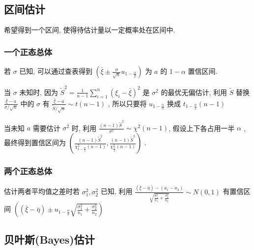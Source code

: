 \documentclass[10pt]{yerbaformat}
\begin{document}
\subsection{区间估计}
\par 希望得到一个区间, 使得待估计量以一定概率处在区间中.
\subsubsection{一个正态总体}
\par 若 $\sigma$ 已知, 可以通过查表得到 $\left(\bar{\xi} \pm \frac{\sigma}{\sqrt{n}} u_{1-\frac{\alpha}{2}}\right)$ 为 $a$ 的 $1-\alpha$ 置信区间.

\par 当 $\sigma$ 未知时, 因为 $\tilde{S}^{2}=\frac{1}{n-1} \sum_{i=1}^{n}\left(\xi_{i}-\bar{\xi}\right)^{2}$ 是 $\sigma^{2}$ 的最优无偏估计, 利用 $\tilde{S}$ 替换 $\frac{\bar{\xi}-a}{\sigma / \sqrt{n}}$ 中的 $\sigma$ 有 $\frac{\bar{\xi}-a}{\tilde{S} / \sqrt{n}} \sim t(n-1)$ , 所以只要将 $u_{1-\frac{\alpha}{2}}$ 换成 $t_{1-\frac{\alpha}{2}}(n-1)$

\par 当未知 $a$ 需要估计 $\sigma^2$ 时, 利用 $\frac{(n-1) \tilde{S}^{2}}{\sigma^{2}} \sim \chi^{2}(n-1)$, 假设上下各占用一半 $\alpha$ , 最终得到置信区间为 $\left(\frac{(n-1) \tilde{S}^{2}}{\chi_{1-\frac{\alpha}{2}}^{2}(n-1)}, \frac{(n-1) \tilde{S}^{2}}{\chi_{\frac{\alpha}{2}}^{2}(n-1)}\right)$ .

\subsubsection{两个正态总体}
\par 估计两者平均值之差时若 $\sigma_{1}^{2}, \sigma_{2}^{2}$ 已知, 利用 $\frac{(\bar{\xi}-\bar{\eta})-\left(a_{1}-a_{2}\right)}{\sqrt{\frac{\sigma_{1}^{2}}{n_{1}}+\frac{\sigma_{2}^{2}}{n_{2}}}} \sim N(0,1)$ 有置信区间 $\left((\bar{\xi}-\bar{\eta}) \pm u_{1-\frac{\alpha}{2}} \sqrt{\frac{\sigma_{1}^{2}}{n_{1}}+\frac{\sigma_{2}^{2}}{n_{2}}}\right)$


\subsection{贝叶斯(Bayes)估计}
\end{document}

